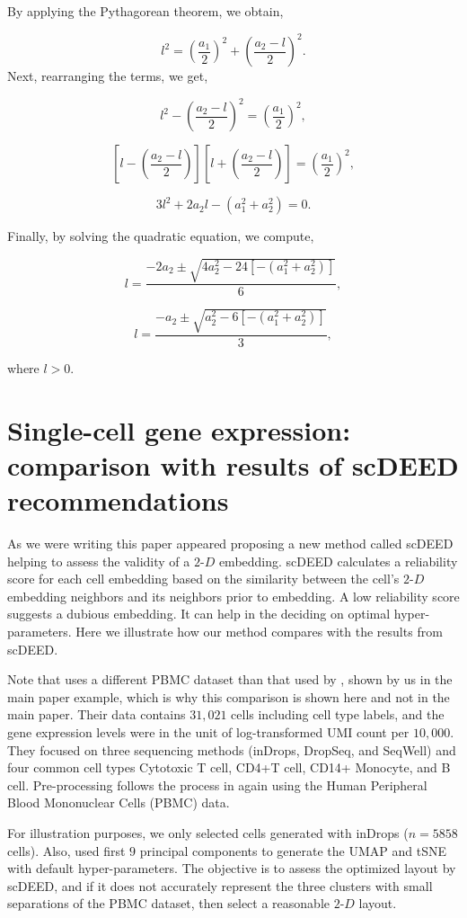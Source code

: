 \documentclass[
  12pt]{article}
\newcommand\gD{$2\text{-}D$}
\begin{document}
By applying the Pythagorean theorem, we obtain,

\[
l^2 = \left(\frac{a_1}{2}\right)^2 + \left(\frac{a_2 - l}{2}\right)^2.
\] Next, rearranging the terms, we get,

\[
l^2 - \left(\frac{a_2 - l}{2}\right)^2 = \left(\frac{a_1}{2}\right)^2,
\]

\[
\left[l - \left(\frac{a_2 - l}{2}\right)\right]\left[l + \left(\frac{a_2 - l}{2}\right)\right] = \left(\frac{a_1}{2}\right)^2,
\]

\[
3l^2 + 2a_2l - (a_1^2 + a_2^2) = 0.
\]

Finally, by solving the quadratic equation, we compute,

\[
l = \frac{-2a_2 \pm \sqrt{4a_2^2 - 24[-(a_1^2 + a_2^2)]}}{6},
\]

\[
l = \frac{-a_2 \pm \sqrt{a_2^2 - 6[-(a_1^2 + a_2^2)]}}{3},
\]

where \(l > 0\).

\section{Single-cell gene expression: comparison with results of scDEED
recommendations}\label{single-cell-gene-expression-comparison-with-results-of-scdeed-recommendations}

As we were writing this paper \citet{xia2023} appeared proposing a new
method called scDEED helping to assess the validity of a \gD{}
embedding. scDEED calculates a reliability score for each cell embedding
based on the similarity between the cell's \gD{} embedding neighbors and
its neighbors prior to embedding. A low reliability score suggests a
dubious embedding. It can help in the deciding on optimal
hyper-parameters. Here we illustrate how our method compares with the
results from scDEED.

Note that \citet{xia2023} uses a different PBMC dataset than that used
by \citet{chen2024}, shown by us in the main paper example, which is why
this comparison is shown here and not in the main paper. Their data
contains \(31,021\) cells including cell type labels, and the gene
expression levels were in the unit of log-transformed UMI count per
\(10,000\). They focused on three sequencing methods (inDrops, DropSeq,
and SeqWell) and four common cell types Cytotoxic T cell, CD4+T cell,
CD14+ Monocyte, and B cell. Pre-processing follows the process in
\citet{xia2023} again using the Human Peripheral Blood Mononuclear Cells
(PBMC) data.

For illustration purposes, we only selected cells generated with inDrops
(\(n=5858\) cells). Also, \citet{xia2023} used first \(9\) principal
components to generate the UMAP and tSNE with default hyper-parameters.
The objective is to assess the optimized layout by scDEED, and if it
does not accurately represent the three clusters with small separations
of the PBMC dataset, then select a reasonable \gD{} layout.
\end{document}
